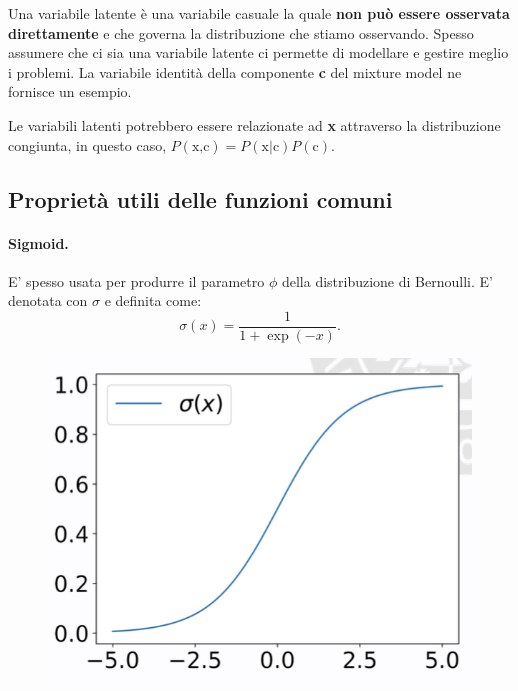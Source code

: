 Una variabile latente è una variabile casuale la quale \textbf{non può essere osservata direttamente} e che governa la distribuzione che stiamo osservando. Spesso assumere che ci sia una variabile latente ci permette di modellare e gestire meglio i problemi.
La variabile identità della componente \textbf{c} del mixture model ne fornisce un esempio.



Le variabili latenti potrebbero essere relazionate ad \textbf{x} attraverso la distribuzione congiunta, in questo caso, $P(\text{x,c})=P(\text{x$|$c})P(\text{c})$.
\newpage
\subsection{Proprietà utili delle funzioni comuni}
\paragraph{Sigmoid.} E' spesso usata per produrre il parametro $\phi$ della distribuzione di Bernoulli. E' denotata con $\sigma$ e definita come:
\begin{equation}
    \sigma(x)=\frac{1}{1+\exp(-x)}.
\end{equation}
\begin{figure}[!h]
    \includegraphics[scale=.7]{images/prerequisites/sigmoid.png}
    \centering
\end{figure}


